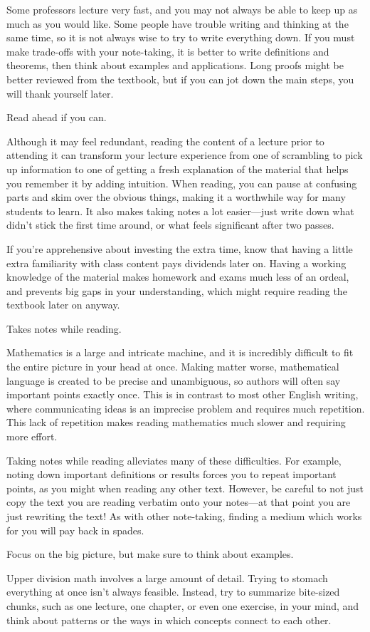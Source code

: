 \documentclass[../main.tex]{subfiles}
\begin{document}
Some professors lecture very fast, and you may not always be able to keep up as much as you would like. Some people have trouble writing and thinking at the same time, so it is not always wise to try to write everything down. If you must make trade-offs with your note-taking, it is better to write definitions and theorems, then think about examples and applications. Long proofs might be better reviewed from the textbook, but if you can jot down the main steps, you will thank yourself later.
\begin{corollary}
    Read ahead if you can.
\end{corollary}
Although it may feel redundant, reading the content of a lecture prior to attending it can transform your lecture experience from one of scrambling to pick up information to one of getting a fresh explanation of the material that helps you remember it by adding intuition. When reading, you can pause at confusing parts and skim over the obvious things, making it a worthwhile way for many students to learn. It also makes taking notes a lot easier---just write down what didn't stick the first time around, or what feels significant after two passes.

If you're apprehensive about investing the extra time, know that having a little extra familiarity with class content pays dividends later on. Having a working knowledge of the material makes homework and exams much less of an ordeal, and prevents big gaps in your understanding, which might require reading the textbook later on anyway.
\begin{corollary}
    Takes notes while reading.
\end{corollary}
Mathematics is a large and intricate machine, and it is incredibly difficult to fit the entire picture in your head at once. Making matter worse, mathematical language is created to be precise and unambiguous, so authors will often say important points exactly once. This is in contrast to most other English writing, where communicating ideas is an imprecise problem and requires much repetition. This lack of repetition makes reading mathematics much slower and requiring more effort.

Taking notes while reading alleviates many of these difficulties. For example, noting down important definitions or results forces you to repeat important points, as you might when reading any other text. However, be careful to not just copy the text you are reading verbatim onto your notes---at that point you are just rewriting the text! As with other note-taking, finding a medium which works for you will pay back in spades.
\begin{proposition}
    Focus on the big picture, but make sure to think about examples.
\end{proposition}
Upper division math involves a large amount of detail. Trying to stomach everything at once isn't always feasible. Instead, try to summarize bite-sized chunks, such as one lecture, one chapter, or even one exercise, in your mind, and think about patterns or the ways in which concepts connect to each other.
\end{document}
